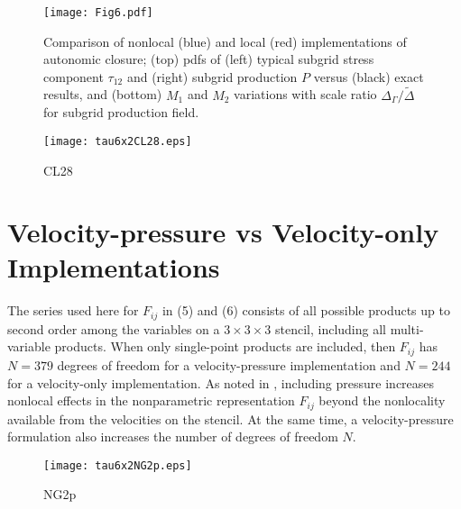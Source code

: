 %
\begin{figure}
	\begin{center}
	\texttt{[image: Fig6.pdf]}
	\caption{ Comparison of nonlocal (blue) and local (red) implementations of autonomic closure; (top) pdfs of (left) typical subgrid stress component $\tau_{12}$ and (right) subgrid production $P$ versus (black) exact results, and (bottom) $M_1$ and $M_2$ variations with scale ratio $\Delta_{\Gamma}/\widetilde{\Delta}$ for subgrid production field. }
	\label{F:6}
	\end{center}
\end{figure}
%
%


%
\begin{figure}
	\begin{center}
	\texttt{[image: tau6x2CL28.eps]}
	\caption{CL28}
	\label{F:CL28}
	\end{center}
\end{figure}
%
%

\section{Velocity-pressure vs Velocity-only Implementations}
\label{sec:IVC}

The  series used here for $F_{ij}$  in (5) and (6) consists of all possible products up to second order among the variables on a  $3 \times 3 \times 3$ stencil, including all multi-variable products. When only single-point products are included, then $F_{ij}$  has $N = 379$ degrees of freedom for a velocity-pressure implementation and $N = 244$ for a velocity-only implementation. As noted in , including pressure increases nonlocal effects in the nonparametric representation $F_{ij}$  beyond the nonlocality available from the velocities on the stencil. At the same time, a velocity-pressure formulation also increases the number of degrees of freedom $N$. 


%
\begin{figure}
	\begin{center}
	\texttt{[image: tau6x2NG2p.eps]}
	\caption{NG2p}
	\label{F:NG2p}
	\end{center}
\end{figure}
%
%


